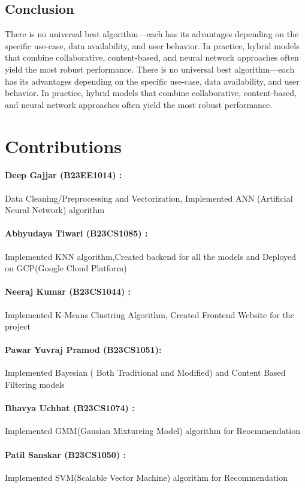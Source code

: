 \documentclass[a4paper]{article}
\theoremstyle{plain}
\begin{document}
\subsection{Conclusion}
There is no universal best algorithm—each has its advantages depending on the specific use-case, data availability, and user behavior. In practice, hybrid models that combine collaborative, content-based, and neural network approaches often yield the most robust performance.
There is no universal best algorithm—each has its advantages depending on the specific use-case, data availability, and user behavior. In practice, hybrid models that combine collaborative, content-based, and neural network approaches often yield the most robust performance.

\section{Contributions}
\paragraph{Deep Gajjar (B23EE1014) : }
Data Cleaning/Preprocessing and Vectorization, Implemented ANN (Artificial Neural Network) algorithm
\paragraph{Abhyudaya Tiwari (B23CS1085) : }
Implemented KNN algorithm,Created backend for all the models and Deployed on GCP(Google Cloud Platform)
\paragraph{Neeraj Kumar (B23CS1044) : }
Implemented K-Means Clustring Algorithm, Created Frontend Website for the project
\paragraph{Pawar Yuvraj Pramod (B23CS1051): }
Implemented Bayesian ( Both Traditional and Modified) and Content Based Filtering models
\paragraph{Bhavya Uchhat (B23CS1074) : }
Implemented GMM(Gausian Mixtureing Model) algorithm for Reocmmendation
\paragraph{Patil Sanskar (B23CS1050) : }
Implemented SVM(Scalable Vector Machine) algorithm for Recommendation
\end{document}

